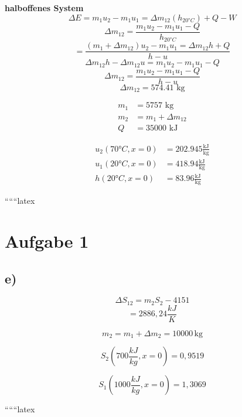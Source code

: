 \textbf{halboffenes System} \\
\begin{equation*}
    \Delta E = m_1 u_2 - m_1 u_1 = \Delta m_{12} \left( h_{20°C} \right) + Q - W
\end{equation*}
\begin{equation*}
    \Delta m_{12} = \frac{m_1 u_2 - m_1 u_1 - Q}{h_{20°C}}
\end{equation*}
\begin{equation*}
    = \frac{(m_1 + \Delta m_{12}) u_2 - m_1 u_1 = \Delta m_{12} h + Q}{h - u}
\end{equation*}
\begin{equation*}
    \Delta m_{12} h - \Delta m_{12} u = m_1 u_2 - m_1 u_1 - Q
\end{equation*}
\begin{equation*}
    \Delta m_{12} = \frac{m_1 u_2 - m_1 u_1 - Q}{h - u}
\end{equation*}
\begin{equation*}
    \Delta m_{12} = 574.41 \text{ kg}
\end{equation*}

\begin{align*}
    m_1 &= 5757 \text{ kg} \\
    m_2 &= m_1 + \Delta m_{12} \\
    Q &= 35000 \text{ kJ}
\end{align*}

\begin{align*}
    u_2 \left( 70°C, x = 0 \right) &= 202.945 \frac{\text{kJ}}{\text{kg}} \\
    u_1 \left( 20°C, x = 0 \right) &= 418.94 \frac{\text{kJ}}{\text{kg}} \\
    h \left( 20°C, x = 0 \right) &= 83.96 \frac{\text{kJ}}{\text{kg}}
\end{align*}

``````latex


\section*{Aufgabe 1}

\subsection*{e)}

\[
\Delta S_{12} = m_2 S_2 - 4151
\]
\[
= 2886,24 \frac{kJ}{K}
\]

\[
m_2 = m_1 + \Delta m_2 = 10000 \, \text{kg}
\]

\[
S_2 \left( 700 \frac{kJ}{kg}, x=0 \right) = 0,9519
\]

\[
S_1 \left( 1000 \frac{kJ}{kg}, x=0 \right) = 1,3069
\]

``````latex


